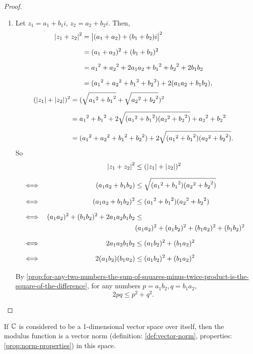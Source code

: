 \documentclass[../MathsNotesBase.tex]{subfiles}
\begin{document}
{\begin{proof}
\begin{enumerate}[label=(\roman*)]
{\[\begin{aligned}
						&= [({a_1}^2 + {b_1}^2)({a_2}^2 + {b_2}^2)]^{\frac{1}{2}} \\
						&= [({a_1}^2 + {b_1}^2)]^{\frac{1}{2}} \, [({a_2}^2 + {b_2}^2)]^{\frac{1}{2}} \\
						&= \modulus{z_1}\modulus{z_2}.
					\end{aligned}\]
				}
				\item{Let ${ z_1 = a_1 + b_1 i, \, z_2 = a_2 + b_2 i }$. Then,
					\[\begin{aligned}
						\modulus{z_1 + z_2}^2 &= \modulus{(a_1 + a_2) + (b_1 + b_2)i}^2 \nn
						&= (a_1 + a_2)^2 + (b_1 + b_2)^2 \nn
						&= {a_1}^2 + {a_2}^2 + 2 a_1 a_2 + {b_1}^2 + {b_2}^2 + 2 b_1 b_2 \nn
						&= ({a_1}^2 + {a_2}^2 + {b_1}^2 + {b_2}^2) + 2 (a_1 a_2 + b_1 b_2),
					\end{aligned}\]
					\nl
					\[\begin{aligned}
						(\modulus{z_1} + \modulus{z_2})^2 &= (\sqrt{{a_1}^2 + {b_1}^2} + \sqrt{{a_2}^2 + {b_2}^2})^2 \nn
						&= {a_1}^2 + {b_1}^2 + 2 \sqrt{({a_1}^2 + {b_1}^2)({a_2}^2 + {b_2}^2)} + {a_2}^2 + {b_2}^2 \nn
						&= ({a_1}^2 + {a_2}^2 + {b_1}^2 + {b_2}^2) + 2 \sqrt{({a_1}^2 + {b_1}^2)({a_2}^2 + {b_2}^2)}.
					\end{aligned}\]
					\nl
					So
					\[\begin{aligned}
						&& \modulus{z_1 + z_2}^2 &\leq (\modulus{z_1} + \modulus{z_2})^2 \nn
						&\iff & (a_1 a_2 + b_1 b_2) &\leq \sqrt{({a_1}^2 + {b_1}^2)({a_2}^2 + {b_2}^2)} \nn
						&\iff & (a_1 a_2 + b_1 b_2)^2 &\leq ({a_1}^2 + {b_1}^2)({a_2}^2 + {b_2}^2) \nn
						&\iff & (a_1 a_2)^2 + (b_1 b_2)^2 + 2 a_1 a_2 b_1 b_2 &\leq \\
						&&& ({a_1}{a_2})^2 + ({a_1}{b_2})^2 + ({b_1}{a_2})^2 + ({b_1}{b_2})^2 \nn
						&\iff & 2 a_1 a_2 b_1 b_2 &\leq ({a_1}{b_2})^2 + ({b_1}{a_2})^2 \nn
						&\iff & 2 (a_1 b_2) (b_1 a_2) &\leq ({a_1}{b_2})^2 + ({b_1}{a_2})^2 \nn
					\end{aligned}\]
					By \autoref{prop:for-any-two-numbers-the-sum-of-squares-minus-twice-product-is-the-square-of-the-difference}, for any numbers ${ p = a_1 b_2, q = b_1 a_2 }$,
					\[ 2 p q \leq p^2 + q^2. \]
				}
			\end{enumerate}
		\end{proof}
		\begin{corollary}
			If $\mathbb{C}^{}$ is considered to be a 1-dimensional vector space over itself, then the modulus function is a vector norm (definition: \ref{def:vector-norm}, properties: \autoref{prop:norm-properties}) in this space.
		\end{corollary}
	
}
\end{document}
